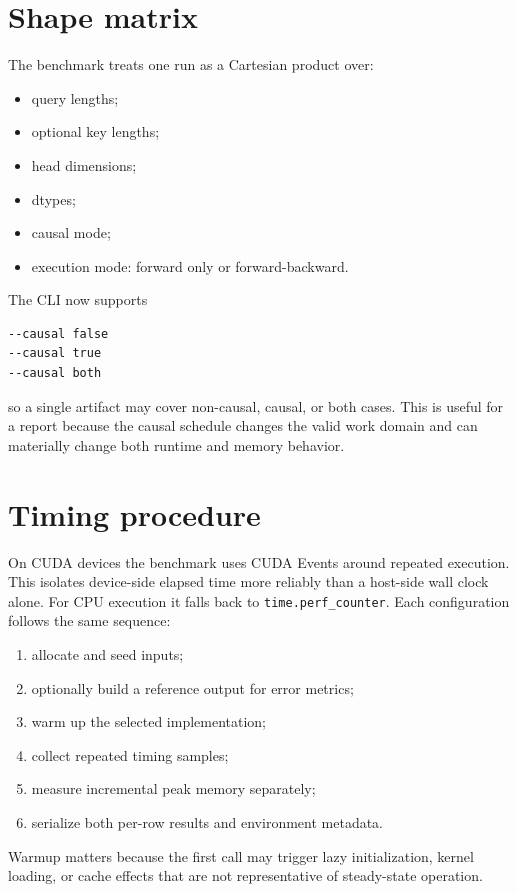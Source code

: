\section{Shape matrix}

The benchmark treats one run as a Cartesian product over:
\begin{itemize}
  \item query lengths;
  \item optional key lengths;
  \item head dimensions;
  \item dtypes;
  \item causal mode;
  \item execution mode: forward only or forward-backward.
\end{itemize}

The CLI now supports
\begin{lstlisting}[language=bash]
--causal false
--causal true
--causal both
\end{lstlisting}
so a single artifact may cover non-causal, causal, or both cases. This is useful for a report because the causal schedule changes the valid work domain and can materially change both runtime and memory behavior.

\section{Timing procedure}

On CUDA devices the benchmark uses CUDA Events around repeated execution. This isolates device-side elapsed time more reliably than a host-side wall clock alone. For CPU execution it falls back to \texttt{time.perf\_counter}. Each configuration follows the same sequence:
\begin{enumerate}
  \item allocate and seed inputs;
  \item optionally build a reference output for error metrics;
  \item warm up the selected implementation;
  \item collect repeated timing samples;
  \item measure incremental peak memory separately;
  \item serialize both per-row results and environment metadata.
\end{enumerate}

Warmup matters because the first call may trigger lazy initialization, kernel loading, or cache effects that are not representative of steady-state operation.

